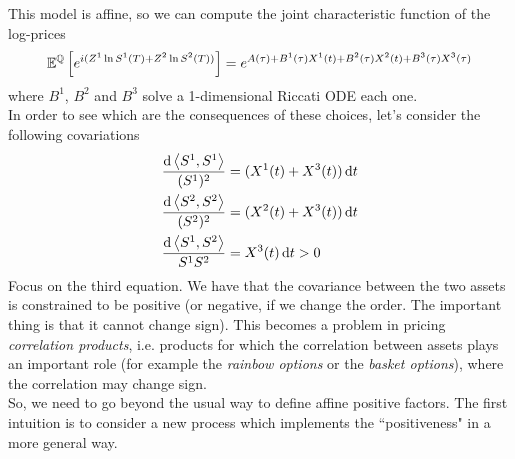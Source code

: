 This model is affine, so we can compute the joint characteristic function of the log-prices
\begin{equation*}
    \mathbb{E}^{\mathbb{Q}}\left[e^{i(Z^1\ln S^1(T)+Z^2\ln S^2(T))}\right] = e^{A(\tau) + B^1(\tau)X^1(t) + B^2(\tau)X^2(t)+ B^3(\tau)X^3(\tau)}
\end{equation*}
where $B^1$, $B^2$ and $B^3$ solve a 1-dimensional Riccati ODE each one.\\
In order to see which are the consequences of these choices, let's consider the following covariations
\begin{align*} %
    \frac{\dd\expval{S^1,S^1}}{(S^1)^2} &= (X^1(t)+X^3(t))\,\dd t \\
    \frac{\dd\expval{S^2,S^2}}{(S^2)^2} &= (X^2(t)+X^3(t))\,\dd t \\
    \frac{\dd\expval{S^1,S^2}}{S^1 S^2} &= X^3(t)\,\dd t > 0
\end{align*}
Focus on the third equation. We have that the covariance between the two assets is constrained to be positive (or negative, if we change the order. The important thing is that it cannot change sign). This becomes a problem in pricing \emph{correlation products}, i.e. products for which the correlation between assets plays an important role (for example the \emph{rainbow options} or the \emph{basket options}), where the correlation may change sign.\\
So, we need to go beyond the usual way to define affine positive factors. The first intuition is to consider a new process which implements the ``positiveness" in a more general way.

